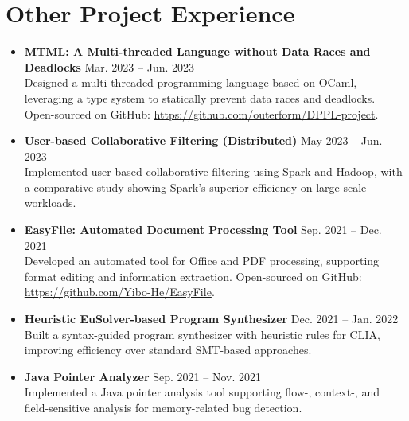 \documentclass[letterpaper,11pt]{article}
\begin{document}
\section{Other Project Experience}
\begin{itemize}[leftmargin=*]

    \item \textbf{MTML: A Multi-threaded Language without Data Races and Deadlocks} \hfill Mar. 2023 -- Jun. 2023 \vspace{0.2cm}\\
    {\small Designed a multi-threaded programming language based on OCaml, leveraging a type system to statically prevent data races and deadlocks. Open-sourced on GitHub: \href{https://github.com/outerform/DPPL-project}{https://github.com/outerform/DPPL-project}.}

    \item \textbf{User-based Collaborative Filtering (Distributed)} \hfill May 2023 -- Jun. 2023 \vspace{0.2cm}\\
    {\small Implemented user-based collaborative filtering using Spark and Hadoop, with a comparative study showing Spark's superior efficiency on large-scale workloads.}

    \item \textbf{EasyFile: Automated Document Processing Tool} \hfill Sep. 2021 -- Dec. 2021 \vspace{0.2cm}\\
    {\small Developed an automated tool for Office and PDF processing, supporting format editing and information extraction. Open-sourced on GitHub: \href{https://github.com/Yibo-He/EasyFile}{https://github.com/Yibo-He/EasyFile}.}

    \item \textbf{Heuristic EuSolver-based Program Synthesizer} \hfill Dec. 2021 -- Jan. 2022 \vspace{0.2cm}\\
    {\small Built a syntax-guided program synthesizer with heuristic rules for CLIA, improving efficiency over standard SMT-based approaches.}

    \item \textbf{Java Pointer Analyzer} \hfill Sep. 2021 -- Nov. 2021 \vspace{0.2cm}\\
    {\small Implemented a Java pointer analysis tool supporting flow-, context-, and field-sensitive analysis for memory-related bug detection.}

\end{itemize}
\end{document}
